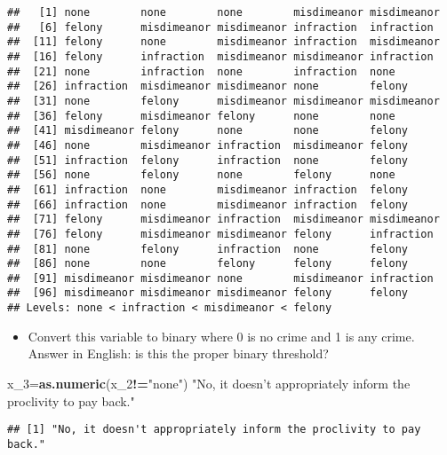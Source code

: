 \documentclass[]{article}
\newenvironment{Shaded}{\begin{snugshade}}{\end{snugshade}}
\newcommand{\KeywordTok}[1]{\textcolor[rgb]{0.13,0.29,0.53}{\textbf{#1}}}
\newcommand{\DecValTok}[1]{\textcolor[rgb]{0.00,0.00,0.81}{#1}}
\newcommand{\StringTok}[1]{\textcolor[rgb]{0.31,0.60,0.02}{#1}}
\newcommand{\OperatorTok}[1]{\textcolor[rgb]{0.81,0.36,0.00}{\textbf{#1}}}
\newcommand{\NormalTok}[1]{#1}
\providecommand{\tightlist}{%
  \setlength{\itemsep}{0pt}\setlength{\parskip}{0pt}}
\begin{document}
\begin{verbatim}
##   [1] none        none        none        misdimeanor misdimeanor
##   [6] felony      misdimeanor misdimeanor infraction  infraction 
##  [11] felony      none        misdimeanor infraction  misdimeanor
##  [16] felony      infraction  misdimeanor misdimeanor infraction 
##  [21] none        infraction  none        infraction  none       
##  [26] infraction  misdimeanor misdimeanor none        felony     
##  [31] none        felony      misdimeanor misdimeanor misdimeanor
##  [36] felony      misdimeanor felony      none        none       
##  [41] misdimeanor felony      none        none        felony     
##  [46] none        misdimeanor infraction  misdimeanor felony     
##  [51] infraction  felony      infraction  none        felony     
##  [56] none        felony      none        felony      none       
##  [61] infraction  none        misdimeanor infraction  felony     
##  [66] infraction  none        misdimeanor infraction  felony     
##  [71] felony      misdimeanor infraction  misdimeanor misdimeanor
##  [76] felony      misdimeanor misdimeanor felony      infraction 
##  [81] none        felony      infraction  none        felony     
##  [86] none        none        felony      felony      felony     
##  [91] misdimeanor misdimeanor none        misdimeanor infraction 
##  [96] misdimeanor misdimeanor misdimeanor felony      felony     
## Levels: none < infraction < misdimeanor < felony
\end{verbatim}

\begin{itemize}
\tightlist
\item
  Convert this variable to binary where 0 is no crime and 1 is any
  crime. Answer in English: is this the proper binary threshold?
\end{itemize}

\begin{Shaded}
\begin{Highlighting}[]
\NormalTok{x_}\DecValTok{3}\NormalTok{=}\KeywordTok{as.numeric}\NormalTok{(x_}\DecValTok{2}\OperatorTok{!=}\StringTok{"none"}\NormalTok{)}
\StringTok{"No, it doesn't appropriately inform the proclivity to pay back."}
\end{Highlighting}
\end{Shaded}

\begin{verbatim}
## [1] "No, it doesn't appropriately inform the proclivity to pay back."
\end{verbatim}
\end{document}
